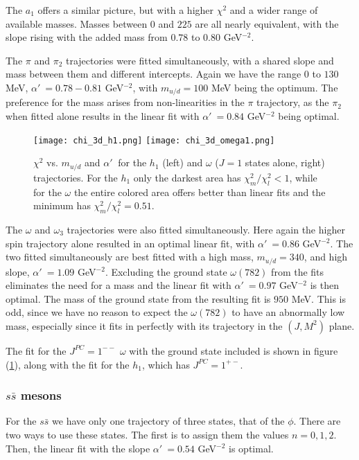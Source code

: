 \documentclass[11pt,a4]{article}
\newcommand{\alp}{\ensuremath{\alpha'\:}}
\newcommand{\ssb}{s\bar{s}}
\newcommand{\rchi}[1]{\ensuremath{\chi^2_m/\chi^2_l = #1}}
\newcommand{\mud}{m_{u/d}}
\begin{document}
		The \(a_1\) offers a similar picture, but with a higher \(\chi^2\) and a wider range of available masses. Masses between \(0\) and \(225\) are all nearly equivalent, with the slope rising with the added mass from \(0.78\) to \(0.80\) GeV\(^{-2}\).
		
		The \(\pi\) and \(\pi_2\) trajectories were fitted simultaneously, with a shared slope and mass between them and different intercepts. Again we have the range \(0\) to \(130\) MeV, \(\alp = 0.78-0.81\) GeV\(^{-2}\), with \(\mud = 100\) MeV being the optimum. The preference for the mass arises from non-linearities in the \(\pi\) trajectory, as the \(\pi_2\) when fitted alone results in the linear fit with \(\alp = 0.84\) GeV\(^{-2}\) being optimal.
		
		\begin{figure}[t!] \centering
						\texttt{[image: chi\_3d\_h1.png]}	 \hfill
						\texttt{[image: chi\_3d\_omega1.png]}
						\caption{\label{fig:chi_n_h1_omg} \(\chi^2\) vs. \(\mud\) and \(\alp\) for the \(h_1\) (left) and \(\omega\) (\(J=1\) states alone, right) trajectories. For the \(h_1\) only the darkest area has \(\chi^2_m/\chi^2_l < 1\), while for the \(\omega\) the entire colored area offers better than linear fits and the minimum has \rchi{0.51}.}
				\end{figure}
		
		The \(\omega\) and \(\omega_3\) trajectories were also fitted simultaneously. Here again the higher spin trajectory alone resulted in an optimal linear fit, with \(\alp = 0.86\) GeV\(^{-2}\). The two fitted simultaneously are best fitted with a high mass, \(\mud = 340\), and high slope, \(\alp = 1.09\) GeV\(^{-2}\). Excluding the ground state \(\omega(782)\) from the fits eliminates the need for a mass and the linear fit with \(\alp = 0.97\) GeV\(^{-2}\) is then optimal. The mass of the ground state from the resulting fit is \(950\) MeV. This is odd, since we have no reason to expect the \(\omega(782)\) to have an abnormally low mass, especially since it fits in perfectly with its trajectory in the \((J,M^2)\) plane.
		
		The fit for the \(J^{PC} = 1^{--}\) \(\omega\) with the ground state included is shown in figure (\ref{fig:chi_n_h1_omg}), along with the fit for the \(h_1\), which has \(J^{PC} = 1^{+-}\).
							
	\subsubsection{\texorpdfstring{$\ssb$}{s-sbar} mesons}
		For the \(\ssb\) we have only one trajectory of three states, that of the \(\phi\). There are two ways to use these states. The first is to assign them the values \(n = 0,1,2\). Then, the linear fit with the slope \(\alp = 0.54\) GeV\(^{-2}\) is optimal.
		
\end{document}
